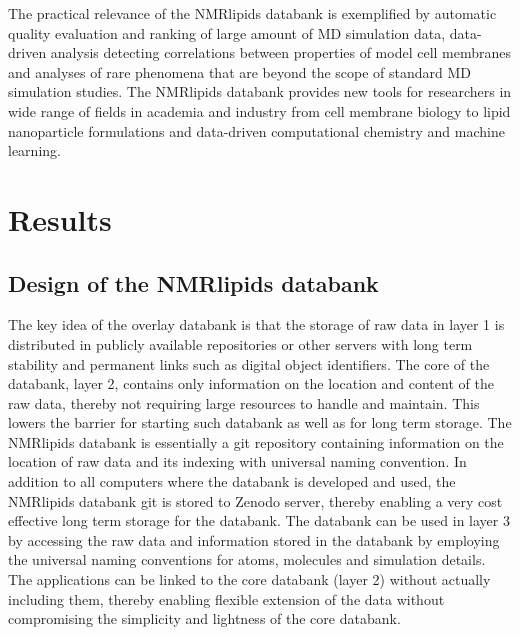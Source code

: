 \documentclass[fleqn,10pt]{wlscirep}
\begin{document}
The practical relevance of the NMRlipids databank is exemplified by automatic quality evaluation and ranking of large amount of MD simulation data, data-driven analysis detecting correlations between properties of model cell membranes and analyses of rare phenomena that are beyond the scope of standard MD simulation studies. The NMRlipids databank provides new tools for researchers in wide range of fields in academia and industry from cell membrane biology to lipid nanoparticle formulations and data-driven computational chemistry and machine learning. 


\section{Results}

\subsection{Design of the NMRlipids databank}
The key idea of the overlay databank is that the storage of raw data in layer 1 is distributed in publicly available repositories or other servers with long term stability and permanent links such as digital object identifiers. The core of the databank, layer 2, contains only information on the location and content of the raw data, thereby not requiring large resources to handle and maintain. This lowers the barrier for starting such databank as well as for long term storage. The NMRlipids databank is essentially a git repository containing information on the location of raw data and its indexing with universal naming convention. In addition to all computers where the databank is developed and used, the NMRlipids databank git is stored to Zenodo server, thereby enabling a very cost effective long term storage for the databank. The databank can be used in layer 3 by accessing the raw data and information stored in the databank by employing the universal naming conventions for atoms, molecules and simulation details. The applications can be linked to the core databank (layer 2) without actually including them, thereby enabling flexible extension of the data without compromising the simplicity and lightness of the core databank.
\end{document}
